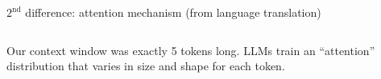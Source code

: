 \documentclass[aspectratio=169]{beamer}
\begin{document}
\begin{frame}{$2^{\mbox{nd}}$ difference: attention mechanism (from language translation)}
\Large
\vspace{0.35 cm}
\begin{columns}
\end{columns}

\vspace{0.25 cm}
Our context window was exactly 5 tokens long. LLMs train an ``attention'' distribution that varies in size and shape for each token.
\end{frame}
\end{document}
